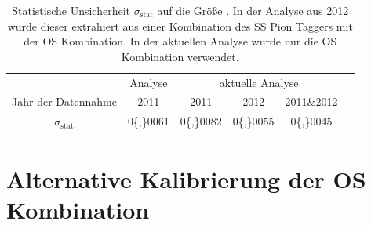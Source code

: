 \begin{table}[htbp]
	\centering
	\caption{Statistische Unsicherheit $\sigma_\text{stat}$ auf die Größe \dmd. In der Analyse aus \num{2012} \cite{dmd_messung} wurde dieser extrahiert aus einer Kombination des SS Pion Taggers mit der OS Kombination. In der aktuellen Analyse wurde nur die OS Kombination verwendet.}
	\label{tab:statFehler} 
	\begin{tabular}{c|c|cccc}
	\toprule
         			&\lhcb Analyse & \multicolumn{3}{c}{aktuelle Analyse} \\  
        Jahr der Datennahme & \num{2011}	 & \num{2011} & \num{2012} & \num{2011}\&\num{2012}\\ 
        \midrule
       $\sigma_\text{stat}$	& \num{0{,}0061} & \num{0{,}0082} & \num{0{,}0055} & \num{0{,}0045} \\ 
       \bottomrule
	\end{tabular}
\end{table}

\section{Alternative Kalibrierung der OS Kombination}


